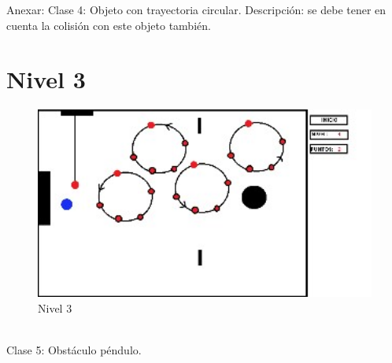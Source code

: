 \documentclass{article}
\begin{document}
Anexar:
Clase 4: Objeto con trayectoria circular.
Descripción: se debe tener en cuenta la colisión con este objeto también.

\section{Nivel 3}

\begin{figure}[h!]
\centering
\includegraphics[width=1.1\textwidth]{3.jpg}
\caption{\label{fig1}Nivel 3}
\end{figure}
\\

Clase 5: Obstáculo péndulo.
\end{document}
